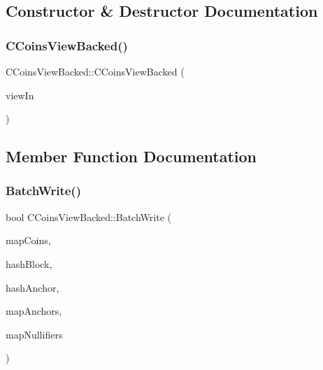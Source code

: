 \subsection{Constructor \& Destructor Documentation}
\mbox{\label{class_c_coins_view_backed_af86a3b07433e8d84678772411791125e}} 
\subsubsection{\texorpdfstring{C\+Coins\+View\+Backed()}{CCoinsViewBacked()}}
{\footnotesize\ttfamily C\+Coins\+View\+Backed\+::\+C\+Coins\+View\+Backed (\begin{DoxyParamCaption}\item[{\mbox{\hyperlink{class_c_coins_view}{C\+Coins\+View}} $\ast$}]{view\+In }\end{DoxyParamCaption})}



\subsection{Member Function Documentation}
\mbox{\label{class_c_coins_view_backed_ae0f10af7d1cd7706f57628c38426c75c}} 
\subsubsection{\texorpdfstring{Batch\+Write()}{BatchWrite()}}
{\footnotesize\ttfamily bool C\+Coins\+View\+Backed\+::\+Batch\+Write (\begin{DoxyParamCaption}\item[{\mbox{\hyperlink{coins_8h_a2886ba2fd0428bae777e1cbcabc02834}{C\+Coins\+Map}} \&}]{map\+Coins,  }\item[{const \mbox{\hyperlink{classuint256}{uint256}} \&}]{hash\+Block,  }\item[{const \mbox{\hyperlink{classuint256}{uint256}} \&}]{hash\+Anchor,  }\item[{\mbox{\hyperlink{coins_8h_a070827cc9d21a91b8f4f4f52a6f7c848}{C\+Anchors\+Map}} \&}]{map\+Anchors,  }\item[{\mbox{\hyperlink{coins_8h_ab651cc287e9594190ef77d2fca2b14c7}{C\+Nullifiers\+Map}} \&}]{map\+Nullifiers }\end{DoxyParamCaption})\hspace{0.3cm}{\ttfamily [virtual]}}

